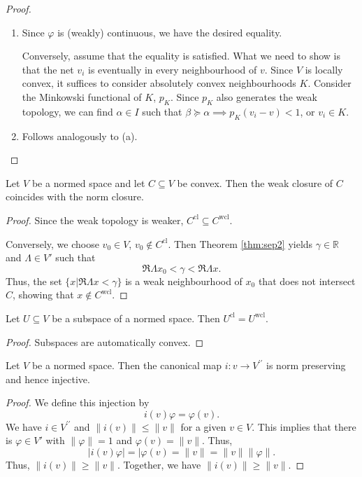 \documentclass[twoside,symmetric, openany, 12pt]{./tuftebook}
\theoremstyle{definition}
\theoremstyle{definition}
\theoremstyle{definition}
\newenvironment{parts}{\begin{enumerate}[label=(\alph*)]}{\end{enumerate}}
\newcommand{\R}{\mathbb{R}}
\begin{document}
\begin{proof}
	\begin{parts}
		\item Since $\varphi$ is (weakly) continuous, we have the desired equality. 
		
		Conversely, assume that the equality is satisfied. What we need to show is that the net $v_i$ is eventually in every neighbourhood of $v$. Since $V$ is locally convex, it suffices to consider absolutely convex neighbourhoods $K$. Consider the Minkowski functional of $K$, $p_K$. Since $p_K$ also generates the weak topology, we can find $\alpha\in I$ such that $\beta\succeq \alpha \implies p_K(v_i-v)<1$, or $v_i\in K$.
		\item Follows analogously to (a).\qedhere
	\end{parts}
\end{proof}
\begin{Theorem}
	Let $V$ be a normed space and let $C\subseteq V$ be convex. Then the weak closure of $C$ coincides with the norm closure.
\end{Theorem}
\begin{proof}
	Since the weak topology is weaker, $C^\text{cl}\subseteq C^\text{wcl}$.
	
	Conversely, we choose $v_0\in V$, $v_0\not\in C^\text{cl}$. Then Theorem \ref{thm:sep2} yields $\gamma\in \R$ and $\Lambda\in V'$ such that
	\[\Re \Lambda x_0<\gamma < \Re \Lambda x.\]
	Thus, the set $\{x|\Re \Lambda x< \gamma\}$ is a weak neighbourhood of $x_0$ that does not intersect $C$, showing that $x\not\in C^\text{wcl}$. 
\end{proof}
\begin{Corollary}
	Let $U\subseteq V$ be a subspace of a normed space. Then $U^\text{cl}=U^\text{wcl}$.
\end{Corollary}
\begin{proof}
	Subspaces are automatically convex.
\end{proof}
\begin{Theorem}
	Let $V$ be a normed space. Then the canonical map $i:v\to V^{\prime\prime}$ is norm preserving and hence injective.
\end{Theorem}
\begin{proof}
	We define this injection by
	\[
	i(v)\varphi = \varphi(v)
	.\] 
	We have $i\in V^{\prime\prime}$ and $\|i(v)\|\le \|v\|$ for a given $v\in V$. This implies that there is $\varphi\in V'$ with $\|\varphi\|=1$ and $\varphi(v)=\|v\|$. Thus,
\[
|i(v)\varphi|=|\varphi(v)=\|v\|=\|v\|\|\varphi\|
.\] 
Thus, $\|i(v)\|\ge \|v\|$. Together, we have $\|i(v)\|\ge \|v\|$.
\end{proof}
\end{document}

